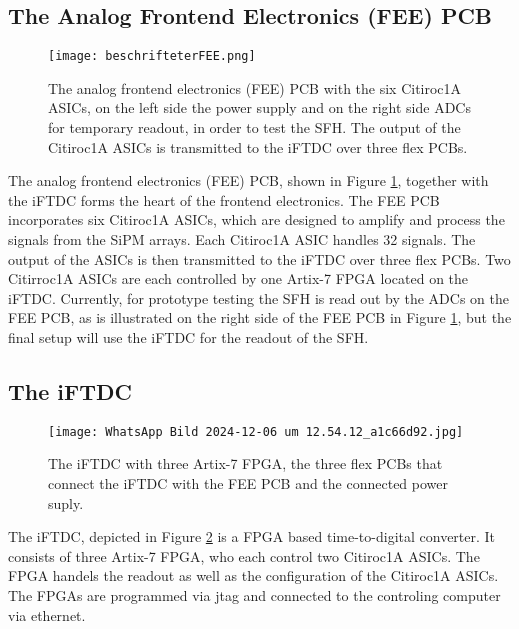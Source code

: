\subsection{The Analog Frontend Electronics (FEE) PCB}
\begin{figure}[H]
    \centering
    \texttt{[image: beschrifteterFEE.png]}
    \caption{The analog frontend electronics (FEE) PCB with the six Citiroc1A ASICs, on the left side the power supply and on the right side ADCs for temporary readout, in order to test the SFH.
    The output of the Citiroc1A ASICs is transmitted to the iFTDC over three flex PCBs.\autocite{InternalcommunicationKarl}}
    \label{fig:FEE}
\end{figure}
The analog frontend electronics (FEE) PCB, shown in Figure \ref{fig:FEE}, together with the iFTDC forms the heart of the frontend electronics.
The FEE PCB incorporates six Citiroc1A ASICs, which are designed to amplify and process the signals from the SiPM arrays.
Each Citiroc1A ASIC handles 32 signals. The output of the ASICs is then transmitted to the iFTDC over three flex PCBs.
Two Citirroc1A ASICs are each controlled by one Artix-7 FPGA located on the iFTDC.\autocite{InternalcommunicationIgor}
\newline
Currently, for prototype testing the SFH is read out by the ADCs on the FEE PCB, as is illustrated on the right side of the FEE PCB in Figure \ref{fig:FEE}, but the final setup will use the iFTDC for the readout of the SFH.\autocite{InternalcommunicationKarl} 
\subsection{The iFTDC}\label{sec:iFTDC}
\begin{figure}[H]
    \centering
    \texttt{[image: WhatsApp Bild 2024-12-06 um 12.54.12\_a1c66d92.jpg]}
    \caption{The iFTDC with three Artix-7 FPGA, the three flex PCBs that connect the iFTDC with the FEE PCB and the connected power suply.}
    \label{fig:iFTDC}
\end{figure}

The iFTDC, depicted in Figure \ref{fig:iFTDC} is a FPGA based time-to-digital converter. It consists of three Artix-7 FPGA, who each control two Citiroc1A ASICs.
The FPGA handels the readout as well as the configuration of the Citiroc1A ASICs\autocite{InternalcommunicationIgor}.
\newline
The FPGAs are programmed via jtag and connected to the controling computer via ethernet.
